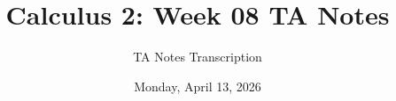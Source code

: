 \documentclass[11pt, a4paper]{article}
\theoremstyle{colonstyle}
\begin{document}
\title{Calculus 2: Week 08 TA Notes}
\author{TA Notes Transcription}
\date{Monday, April 13, 2026} 






\end{document}
